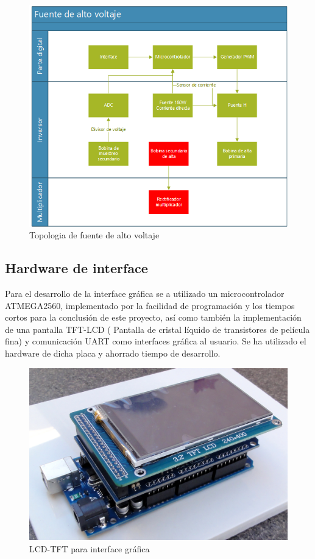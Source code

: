 \begin{figure}[H]
\centering
\includegraphics[width=12
cm]{Capitulo3/figs/diagrama.png}
\caption{Topologia de fuente de alto voltaje}
\end{figure}
\newpage
\subsection{Hardware de interface}
Para el desarrollo de la interface gráfica se a utilizado un microcontrolador ATMEGA2560, implementado por la facilidad de programación y los tiempos cortos para la conclusión de este proyecto, así como también la implementación de una pantalla TFT-LCD ( Pantalla de cristal líquido de transistores de película fina) y comunicación UART como interfaces gráfica al usuario. Se ha utilizado el hardware de dicha placa y ahorrado tiempo de desarrollo. \\


\begin{figure}[H]
\centering
\includegraphics[width=9
cm]{Capitulo3/figs/pantalla0.jpg}
\caption{LCD-TFT para interface gráfica}
\end{figure}
\newpage
